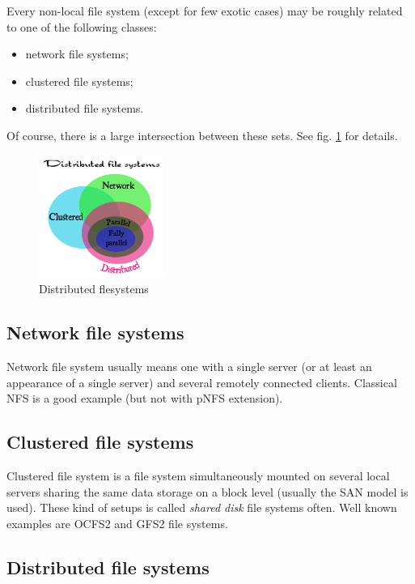 \documentclass[10pt, a5paper]{article}
\begin{document}
Every non-local file system (except for few exotic cases) may be roughly related to one of the following classes:

\begin{itemize}
  \item network file systems;
  \item clustered file systems;
  \item distributed file systems.
\end{itemize}

Of course, there is a large intersection between these sets. See fig. \ref{fig:Sav1} for details.

\begin{figure}[h]
  \centering
\includegraphics[height=4cm]{123_genesis.png}
\caption{Distributed flesystems}\label{fig:Sav1}
\end{figure}

\subsection*{Network file systems}

Network file system usually means one with a single server (or at least an appearance of a single server) and several remotely connected clients. Classical NFS\cite{bib3} is a good example (but not with pNFS\cite{bib4} extension).

\subsection*{Clustered file systems}

Clustered file system is a file system simultaneously mounted on several local servers sharing the same data storage on a block level (usually the SAN\cite{bib5} model is used). These kind of setups is called \emph{shared disk} file systems often. Well known examples are OCFS2\cite{bib6} and GFS2\cite{bib7} file systems.

\subsection*{Distributed file systems}
\end{document}
